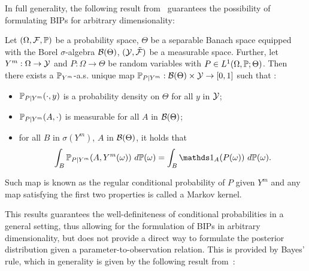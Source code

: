 In full generality, the following result from~\cite[Theorem 8.1]{Kallenberg2021} guarantees the possibility of formulating BIPs for arbitrary dimensionality:
\begin{thm} 
    Let $ (\Omega, \mathcal F , \mathbb P) $ be a probability space, $\Theta$ be a separable Banach space equipped with the Borel $\sigma$-algebra $\mathcal B (\Theta)$, $(\mathcal Y, \tilde{\mathcal F})$ be a measurable space.
    Further, let $Y^m:\Omega \rightarrow \mathcal Y$ and $P : \Omega \rightarrow \Theta$ be random variables with $P \in L^1(\Omega, \mathbb P; \Theta) $. \newline
    Then there exists a $\mathbb P_{Y^m}$-a.s. unique map $\mathbb P_{P \mid Y^m} : \mathcal B (\Theta) \times \mathcal Y \rightarrow [0,1] $ such that :
    \begin{itemize}
        \item $\mathbb P_{P \mid Y^m}(\cdot, y)$ is a probability density on $\Theta$ for all $y$ in $\mathcal Y$;
        \item $\mathbb P_{P \mid Y^m}(A, \cdot)$ is measurable for all $A$ in $\mathcal B (\Theta)$;
        \item for all $B$ in $\sigma(Y^m)$, $A$ in $\mathcal B (\Theta)$, it holds that
                \[ 
                \int_B \bb P_{P \mid Y^m}(A, Y^m(\omega)) \ d\bb P(\omega)= \int_B \ind_A(P(\omega)) \ d\bb P(\omega).
                \] 
    \end{itemize}
    Such map is known as the regular conditional probability of $P$ given $Y^m$ and any map satisfying the first two properties is called a Markov kernel.
\end{thm}

This results guarantees the well-definiteness of conditional probabilities in a general setting, thus allowing for the formulation of BIPs in arbitrary dimensionality, but does not provide a direct way to formulate the posterior distribution given a parameter-to-observation relation. 
This is provided by Bayes' rule, which in generality is given by the following result from~\cite[Theorem 14]{DashtiStuart2017}:

